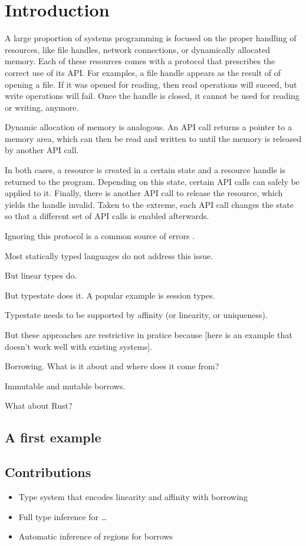 \section{Introduction}

A large proportion of systems programming is focused on the proper
handling of resources, like file handles, network connections, or
dynamically allocated memory. Each of these resources comes with a
protocol that prescribes the correct use of its API.
For examples, a file handle appears as the result of of opening a
file. If it was opened for reading, then read operations will suceed,
but write operations will fail. Once the handle is closed, it cannot
be used for reading or writing, anymore.

Dynamic allocation of memory is analogous. An API call returns a
pointer to a memory area, which can then be read and written to until
the memory is released by another API call.

In both cases, a resource is created in a certain state and a resource
handle is returned to the program. Depending on this state, certain API calls
can safely be applied to it. Finally, there is another API call to
release the resource, which yields the handle invalid.
Taken to the extreme, each API call changes the state so that a
different set of API calls is enabled afterwards. 

Ignoring this protocol is a common source of errors
\cite{is-there-some-paper?}.

Most statically typed languages do not address this issue.

But linear types do.

But typestate does it. A popular example is session types.

Typestate needs to be supported by affinity (or linearity, or
uniqueness).

But these approaches are restrictive in pratice because [here is an
example that doesn't work well with existing systems].

Borrowing. What is it about and where does it come from?

Immutable and mutable borrows.

What about Rust?

\subsection{A first example}
\label{sec:first-example}



\subsection{Contributions}
\label{sec:contributions}

\begin{itemize}
\item Type system that encodes linearity and affinity with borrowing
\item Full type inference for \dots
\item Automatic inference of regions for borrows
\end{itemize}

